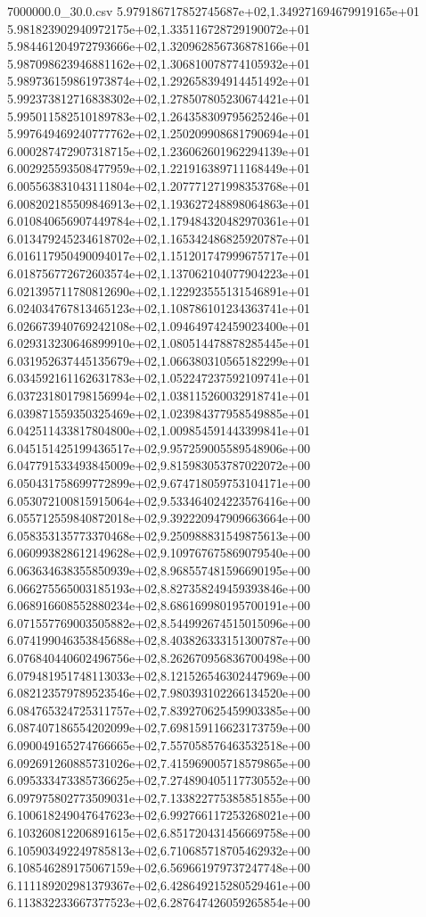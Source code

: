 \begin{filecontents*}{7000000.0_30.0.csv}
5.979186717852745687e+02,1.349271694679919165e+01
5.981823902940972175e+02,1.335116728729190072e+01
5.984461204972793666e+02,1.320962856736878166e+01
5.987098623946881162e+02,1.306810078774105932e+01
5.989736159861973874e+02,1.292658394914451492e+01
5.992373812716838302e+02,1.278507805230674421e+01
5.995011582510189783e+02,1.264358309795625246e+01
5.997649469240777762e+02,1.250209908681790694e+01
6.000287472907318715e+02,1.236062601962294139e+01
6.002925593508477959e+02,1.221916389711168449e+01
6.005563831043111804e+02,1.207771271998353768e+01
6.008202185509846913e+02,1.193627248898064863e+01
6.010840656907449784e+02,1.179484320482970361e+01
6.013479245234618702e+02,1.165342486825920787e+01
6.016117950490094017e+02,1.151201747999675717e+01
6.018756772672603574e+02,1.137062104077904223e+01
6.021395711780812690e+02,1.122923555131546891e+01
6.024034767813465123e+02,1.108786101234363741e+01
6.026673940769242108e+02,1.094649742459023400e+01
6.029313230646899910e+02,1.080514478878285445e+01
6.031952637445135679e+02,1.066380310565182299e+01
6.034592161162631783e+02,1.052247237592109741e+01
6.037231801798156994e+02,1.038115260032918741e+01
6.039871559350325469e+02,1.023984377958549885e+01
6.042511433817804800e+02,1.009854591443399841e+01
6.045151425199436517e+02,9.957259005589548906e+00
6.047791533493845009e+02,9.815983053787022072e+00
6.050431758699772899e+02,9.674718059753104171e+00
6.053072100815915064e+02,9.533464024223576416e+00
6.055712559840872018e+02,9.392220947909663664e+00
6.058353135773370468e+02,9.250988831549875613e+00
6.060993828612149628e+02,9.109767675869079540e+00
6.063634638355850939e+02,8.968557481596690195e+00
6.066275565003185193e+02,8.827358249459393846e+00
6.068916608552880234e+02,8.686169980195700191e+00
6.071557769003505882e+02,8.544992674515015096e+00
6.074199046353845688e+02,8.403826333151300787e+00
6.076840440602496756e+02,8.262670956836700498e+00
6.079481951748113033e+02,8.121526546302447969e+00
6.082123579789523546e+02,7.980393102266134520e+00
6.084765324725311757e+02,7.839270625459903385e+00
6.087407186554202099e+02,7.698159116623173759e+00
6.090049165274766665e+02,7.557058576463532518e+00
6.092691260885731026e+02,7.415969005718579865e+00
6.095333473385736625e+02,7.274890405117730552e+00
6.097975802773509031e+02,7.133822775385851855e+00
6.100618249047647623e+02,6.992766117253268021e+00
6.103260812206891615e+02,6.851720431456669758e+00
6.105903492249785813e+02,6.710685718705462932e+00
6.108546289175067159e+02,6.569661979737247748e+00
6.111189202981379367e+02,6.428649215280529461e+00
6.113832233667377523e+02,6.287647426059265854e+00

\end{filecontents*}
